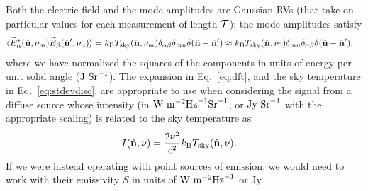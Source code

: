 \documentclass[11pt]{article}
\numberwithin{equation}{section}
\newcommand{\bt}[1]{\mathbf{#1}}
\newcommand{\wt}[1]{\widetilde{#1}}
\newcommand{\kb}{k_{\rm B}}
\begin{document}
Both the electric field and the mode amplitudes are Gaussian RVs (that take on particular values for each measurement of length $\cal T$); the mode amplitudes satisfy
\begin{align}
   \langle \wt{E}^\ast_{\alpha}(\hat{\bt n}, \nu_m) \wt{E}_\beta(\hat{\bt n}^\prime, \nu_n) \rangle 
   & = \kb T_{\rm sky}(\hat{\bt n}, \nu_m) \delta_{\alpha \beta} \delta_{m n} \delta(\hat{\bt n} - \hat{\bt n}^\prime) 
   \approx \kb T_{\rm sky}(\hat{\bt n}, \nu_0) \delta_{m n} \delta_{\alpha \beta} \delta(\hat{\bt n} - \hat{\bt n}^\prime) \mbox{,} \label{eq:stdevdisc}
\end{align}
where we have normalized the squares of the components in units of energy per unit solid angle (${\rm J} \ {\rm Sr}^{-1}$). The expansion in Eq.~\eqref{eq:dft}, and the sky temperature in Eq.~\eqref{eq:stdevdisc}, are appropriate to use when considering the signal from a diffuse source whose intensity (in ${\rm W} \ {\rm m}^{-2} {\rm Hz}^{-1} {\rm Sr}^{-1}$, or ${\rm Jy} \ {\rm Sr}^{-1}$ with the appropriate scaling) is related to the sky temperature as 
\begin{align}
  I(\hat{\bt n}, \nu) & = \frac{2 \nu^2}{c^2} \kb T_{\rm sky}(\hat{\bt n}, \nu) \mbox{.} \label{eq:intensity}
\end{align}
If we were instead operating with point sources of emission, we would need to work with their emissivity $S$ in units of ${\rm W} \ {\rm m}^{-2} {\rm Hz}^{-1}$ or Jy.
\end{document}
